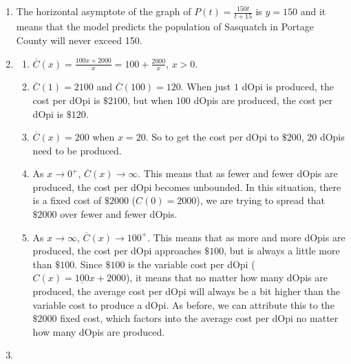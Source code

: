 \begin{enumerate}
\begin{enumerate}
\end{enumerate}

\item The horizontal asymptote of the graph of $P(t) = \frac{150t}{t + 15}$ is $y = 150$ and it means that the model predicts the population of Sasquatch in Portage County will never exceed 150.

\item  \begin{enumerate}

\item $\overline{C}(x) = \frac{100x+2000}{x} = 100 + \frac{2000}{x}$, $x > 0$.

\item  $\overline{C}(1) = 2100$ and $\overline{C}(100) = 120$. When just $1$ dOpi is produced, the cost per dOpi is $\$2100$, but when $100$ dOpis are produced, the cost per dOpi is $\$120$.  

\item  $\overline{C}(x) = 200$ when $x = 20$.  So to get the cost per dOpi to $\$200$, $20$ dOpis need to be produced.

\item  As $x \rightarrow 0^{+}$, $\overline{C}(x) \rightarrow \infty$.  This means that as fewer and fewer dOpis are produced, the cost per dOpi becomes unbounded.  In this situation, there is a fixed cost of $\$2000$ ($C(0) = 2000$), we are trying to spread that $\$2000$ over fewer and fewer dOpis.

\item   As $x \rightarrow \infty$,  $\overline{C}(x) \rightarrow 100^{+}$.  This means that as more and more dOpis are produced, the cost per dOpi approaches $\$100$, but is always a little more than $\$100$.  Since $\$100$ is the variable cost per dOpi ($C(x) = \underline{100}x+2000$), it means that no matter how many dOpis are produced, the average cost per dOpi will always be a bit higher than the variable cost to produce a dOpi.  As before, we can attribute this to the $\$2000$ fixed cost, which factors into the average cost per dOpi no matter how many dOpis are produced.

\end{enumerate}

\item  \begin{enumerate}


\end{enumerate}
\end{enumerate}
